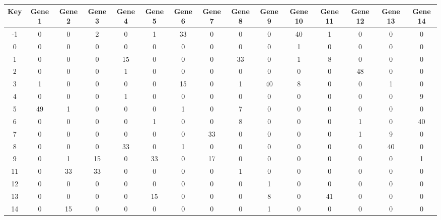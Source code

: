 \begin{tabular}{|c|c|c|c|c|c|c|c|c|c|c|c|c|c|c|}
\hline
Key & Gene 1 & Gene 2 & Gene 3 & Gene 4 & Gene 5 & Gene 6 & Gene 7 & Gene 8 & Gene 9 & Gene 10 & Gene 11 & Gene 12 & Gene 13 & Gene 14 \\
\hline
-1 & 0 & 0 & 2 & 0 & 1 & 33 & 0 & 0 & 0 & 40 & 1 & 0 & 0 & 0 \\
0 & 0 & 0 & 0 & 0 & 0 & 0 & 0 & 0 & 0 & 1 & 0 & 0 & 0 & 0 \\
1 & 0 & 0 & 0 & 15 & 0 & 0 & 0 & 33 & 0 & 1 & 8 & 0 & 0 & 0 \\
2 & 0 & 0 & 0 & 1 & 0 & 0 & 0 & 0 & 0 & 0 & 0 & 48 & 0 & 0 \\
3 & 1 & 0 & 0 & 0 & 0 & 15 & 0 & 1 & 40 & 8 & 0 & 0 & 1 & 0 \\
4 & 0 & 0 & 0 & 1 & 0 & 0 & 0 & 0 & 0 & 0 & 0 & 0 & 0 & 9 \\
5 & 49 & 1 & 0 & 0 & 0 & 1 & 0 & 7 & 0 & 0 & 0 & 0 & 0 & 0 \\
6 & 0 & 0 & 0 & 0 & 1 & 0 & 0 & 8 & 0 & 0 & 0 & 1 & 0 & 40 \\
7 & 0 & 0 & 0 & 0 & 0 & 0 & 33 & 0 & 0 & 0 & 0 & 1 & 9 & 0 \\
8 & 0 & 0 & 0 & 33 & 0 & 1 & 0 & 0 & 0 & 0 & 0 & 0 & 40 & 0 \\
9 & 0 & 1 & 15 & 0 & 33 & 0 & 17 & 0 & 0 & 0 & 0 & 0 & 0 & 1 \\
11 & 0 & 33 & 33 & 0 & 0 & 0 & 0 & 1 & 0 & 0 & 0 & 0 & 0 & 0 \\
12 & 0 & 0 & 0 & 0 & 0 & 0 & 0 & 0 & 1 & 0 & 0 & 0 & 0 & 0 \\
13 & 0 & 0 & 0 & 0 & 15 & 0 & 0 & 0 & 8 & 0 & 41 & 0 & 0 & 0 \\
14 & 0 & 15 & 0 & 0 & 0 & 0 & 0 & 0 & 1 & 0 & 0 & 0 & 0 & 0 \\
\hline
\end{tabular}